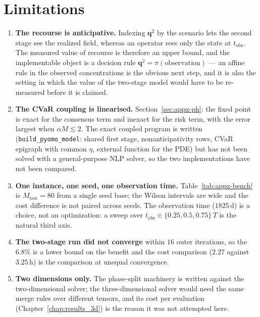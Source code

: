 \documentclass[11pt]{article}
\newcommand{\qq}{\mathbf{q}}
\begin{document}
\section{Limitations}
\label{sec:appx-caveats}

\begin{enumerate}
\item \textbf{The recourse is anticipative.} Indexing $\qq^{2}$ by the scenario
  lets the second stage see the realized field, whereas an operator sees only the
  state at $t_{\mathrm{obs}}$. The measured value of recourse is therefore an
  upper bound, and the implementable object is a decision rule
  $\qq^{2}=\pi(\text{observation})$ --- an affine rule in the observed
  concentrations is the obvious next step, and it is also the setting in which
  the value of the two-stage model would have to be re-measured before it is
  claimed.
\item \textbf{The CVaR coupling is linearised.} Section~\ref{sec:appx-ph}: the
  fixed point is exact for the consensus term and inexact for the risk term, with
  the error largest when $\alpha M\lesssim2$. The exact coupled program is
  written (\texttt{build\_pyomo\_model}: shared first stage, nonanticipativity
  rows, CVaR epigraph with common $\eta$, external function for the PDE) but has
  not been solved with a general-purpose NLP solver, so the two implementations
  have not been compared.
\item \textbf{One instance, one seed, one observation time.} Table~\ref{tab:appx-bench}
  is $M_{\text{test}}=80$ from a single seed base; the Wilson intervals are wide
  and the cost difference is not paired across seeds. The observation time
  ($1825$\,d) is a choice, not an optimization: a sweep over
  $t_{\mathrm{obs}}\in\{0.25,0.5,0.75\}\,T$ is the natural third axis.
\item \textbf{The two-stage run did not converge} within $16$ outer iterations,
  so the $6.8\%$ is a lower bound on the benefit and the cost comparison
  ($2.27$ against $3.25$\,h) is the comparison at unequal convergence.
\item \textbf{Two dimensions only.} The phase-split machinery is written against
  the two-dimensional solver; the three-dimensional solver would need the same
  merge rules over different tensors, and its cost per evaluation
  (Chapter~\ref{chap:results_3d}) is the reason it was not attempted here.
\end{enumerate}
\end{document}
